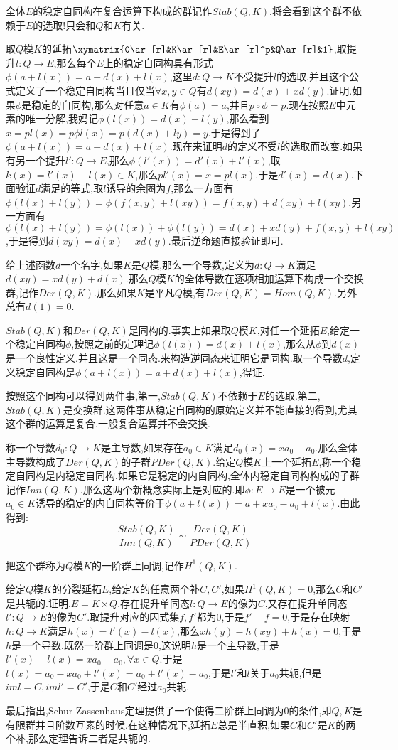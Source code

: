 全体$E$的稳定自同构在复合运算下构成的群记作$Stab(Q,K)$.将会看到这个群不依赖于$E$的选取!只会和$Q$和$K$有关.

取$Q$模$K$的延拓$\xymatrix{0\ar[r]&K\ar[r]&E\ar[r]^p&Q\ar[r]&1}$,取提升$l:Q\to E$,那么每个$E$上的稳定自同构具有形式$\phi(a+l(x))=a+d(x)+l(x)$,这里$d:Q\to K$不受提升$l$的选取,并且这个公式定义了一个稳定自同构当且仅当$\forall x,y\in Q$有$d(xy)=d(x)+xd(y)$.证明.如果$\phi$是稳定的自同构,那么对任意$a\in K$有$\phi(a)=a$,并且$p\circ\phi=p$.现在按照$E$中元素的唯一分解,我妈记$\phi(l(x))=d(x)+l(y)$,那么看到$x=pl(x)=p\phi l(x)=p(d(x)+ly)=y$.于是得到了$\phi(a+l(x))=a+d(x)+l(x)$.现在来证明$d$的定义不受$l$的选取而改变.如果有另一个提升$l':Q\to E$,那么$\phi(l'(x))=d'(x)+l'(x)$,取$k(x)=l'(x)-l(x)\in K$,那么$pl'(x)=x=pl(x)$.于是$d'(x)=d(x)$.下面验证$d$满足的等式,取$l$诱导的余圈为$f$,那么一方面有$\phi(l(x)+l(y))=\phi(f(x,y)+l(xy))=f(x,y)+d(xy)+l(xy)$,另一方面有$\phi(l(x)+l(y))=\phi(l(x))+\phi(l(y))=d(x)+xd(y)+f(x,y)+l(xy)$,于是得到$d(xy)=d(x)+xd(y)$.最后逆命题直接验证即可.

给上述函数$d$一个名字,如果$K$是$Q$模,那么一个导数,定义为$d:Q\to K$满足$d(xy)=xd(y)+d(x)$.那么$Q$模$K$的全体导数在逐项相加运算下构成一个交换群,记作$Der(Q,K)$.那么如果$K$是平凡$Q$模,有$Der(Q,K)=Hom(Q,K)$.另外总有$d(1)=0$.

$Stab(Q,K)$和$Der(Q,K)$是同构的.事实上如果取$Q$模$K$,对任一个延拓$E$,给定一个稳定自同构$\phi$,按照之前的定理记$\phi(l(x))=d(x)+l(x)$,那么从$\phi$到$d(x)$是一个良性定义.并且这是一个同态.来构造逆同态来证明它是同构.取一个导数$d$,定义稳定自同构是$\phi(a+l(x))=a+d(x)+l(x)$,得证.

按照这个同构可以得到两件事,第一,$Stab(Q,K)$不依赖于$E$的选取.第二,$Stab(Q,K)$是交换群.这两件事从稳定自同构的原始定义并不能直接的得到,尤其这个群的运算是复合,一般复合运算并不会交换.

称一个导数$d_0:Q\to K$是主导数,如果存在$a_0\in K$满足$d_0(x)=xa_0-a_0$.那么全体主导数构成了$Der(Q,K)$的子群$PDer(Q,K)$.给定$Q$模$K$上一个延拓$E$,称一个稳定自同构是内稳定自同构,如果它是稳定的内自同构,全体内稳定自同构构成的子群记作$Inn(Q,K)$.那么这两个新概念实际上是对应的.即$\phi:E\to E$是一个被元$a_0\in K$诱导的稳定的内自同构等价于$\phi(a+l(x))=a+xa_0-a_0+l(x)$.由此得到:
$$\frac{Stab(Q,K)}{Inn(Q,K)}\sim\frac{Der(Q,K)}{PDer(Q,K)}$$

把这个群称为$Q$模$K$的一阶群上同调,记作$H^1(Q,K)$.

给定$Q$模$K$的分裂延拓$E$,给定$K$的任意两个补$C,C'$,如果$H^1(Q,K)=0$,那么$C$和$C'$是共轭的.证明.$E=K\rtimes Q$.存在提升单同态$l:Q\to E$的像为$C$,又存在提升单同态$l':Q\to E$的像为$C'$.取提升对应的因式集$f,f'$都为0,于是$f'-f=0$,于是存在映射$h:Q\to K$满足$h(x)=l'(x)-l(x)$,那么$xh(y)-h(xy)+h(x)=0$,于是$h$是一个导数.既然一阶群上同调是0,这说明$h$是一个主导数,于是$l'(x)-l(x)=xa_0-a_0,\forall x\in Q$.于是$l(x)=a_0-xa_0+l'(x)=a_0+l'(x)-a_0$,于是$l'$和$l$关于$a_0$共轭,但是$im l=C,im l'=C'$,于是$C$和$C'$经过$a_0$共轭.

最后指出,Schur-Zassenhaus定理提供了一个使得二阶群上同调为0的条件,即$Q,K$是有限群并且阶数互素的时候.在这种情况下,延拓$E$总是半直积,如果$C$和$C'$是$K$的两个补,那么定理告诉二者是共轭的.








